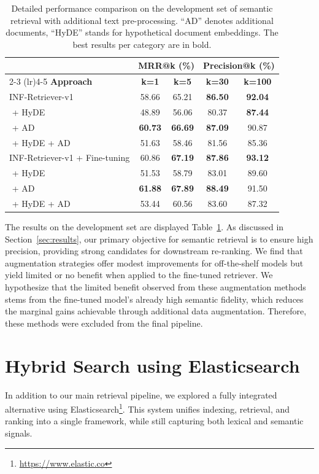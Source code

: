 \begin{table}
  \caption{Detailed performance comparison on the development set of semantic retrieval with additional text pre-processing.
  ``AD'' denotes additional documents, ``HyDE'' stands for hypothetical document embeddings. The best results per category are in bold.}
  \label{tab:performance_dev_detail}
  \begin{tabular}{lcc|cc}
    \toprule
     & \multicolumn{2}{c|}{\textbf{MRR@k (\%)}} & \multicolumn{2}{c}{\textbf{Precision@k (\%)}} \\
     \cmidrule(lr){2-3} \cmidrule(lr){4-5}
     \textbf{Approach} & \textbf{k=1} & \textbf{k=5} & \textbf{k=30} & \textbf{k=100} \\
    \midrule
    INF-Retriever-v1 & 58.66 & 65.21 & \textbf{86.50} & \textbf{92.04} \\
    \,\,+ HyDE & 48.89 & 56.06 & 80.37 & \textbf{87.44} \\
    \,\,+ AD & \textbf{60.73} & \textbf{66.69} & \textbf{87.09} & 90.87 \\
    \,\,+ HyDE + AD & 51.63 & 58.46 & 81.56 & 85.36\\
    \midrule
    INF-Retriever-v1 + Fine-tuning & 60.86 & \textbf{67.19} & \textbf{87.86} & \textbf{93.12} \\
    \,\,+ HyDE & 51.53 & 58.79 & 83.01 & 89.60 \\
    \,\,+ AD & \textbf{61.88} & \textbf{67.89} & \textbf{88.49} & 91.50 \\
    \,\,+ HyDE + AD & 53.44 & 60.56 & 83.60 & 87.32 \\
    \bottomrule
  \end{tabular}
\end{table}



The results on the development set are displayed Table~\ref{tab:performance_dev_detail}.
As discussed in Section~\ref{sec:results}, our primary objective for semantic retrieval is to ensure high precision, providing strong candidates for downstream re-ranking. We find that augmentation strategies offer modest improvements for off-the-shelf models but yield limited or no benefit when applied to the fine-tuned retriever. We hypothesize that the limited benefit observed from these augmentation methods stems from the fine-tuned model’s already high semantic fidelity, which reduces the marginal gains achievable through additional data augmentation. Therefore, these methods were excluded from the final pipeline.

\section{Hybrid Search using Elasticsearch} \label{sec:elastic_search}
In addition to our main retrieval pipeline, we explored a fully integrated alternative using Elasticsearch\footnote{\url{https://www.elastic.co}}. This system unifies indexing, retrieval, and ranking into a single framework, while still capturing both lexical and semantic signals.

